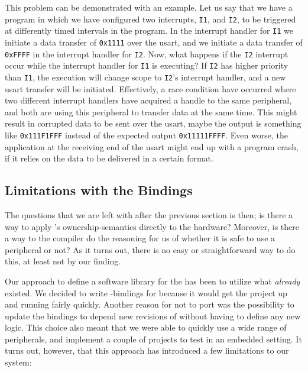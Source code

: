 This problem can be demonstrated with an example.
Let us say that we have a program in which we have configured two interrupts, \texttt{I1}, and \texttt{I2}, to be triggered at differently timed intervals in the program.
In the interrupt handler for \texttt{I1} we initiate a data transfer of \texttt{0x1111} over the \gls{usart}, and we initiate a data transfer of \texttt{0xFFFF} in the interrupt handler for \texttt{I2}.
Now, what happens if the \texttt{I2} interrupt occur while the interrupt handler for \texttt{I1} is executing?
If \texttt{I2} has higher priority than \texttt{I1}, the execution will change scope to \texttt{I2}'s interrupt handler, and a new \gls{usart} transfer will be initiated.
Effectively, a race condition have occurred where two different interrupt handlers have acquired a handle to the same peripheral, and both are using this peripheral to transfer data at the same time.
This might result in corrupted data to be sent over the \gls{usart}, maybe the output is something like \texttt{0x111F1FFF} instead of the expected output \texttt{0x11111FFFF}.
Even worse, the application at the receiving end of the \gls{usart} might end up with a program crash, if it relies on the data to be delivered in a certain format.

\subsection{Limitations with the Bindings}

The questions that we are left with after the previous section is then; is there a way to apply {\rust}'s ownership-semantics directly to the hardware?
Moreover, is there a way to the {\rust} compiler do the reasoning for us of whether it is safe to use a peripheral or not?
As it turns out, there is no easy or straightforward way to do this, at least not by our finding.

Our approach to define a software library for the {\gecko} has been to utilize what \emph{already} existed.
We decided to write {\rust}-bindings for {\emlib} because it would get the project up and running fairly quickly.
Another reason for not to port {\emlib} was the possibility to update the bindings to depend new revisions of {\emlib} without having to define any new logic.
This choice also meant that we were able to quickly use a wide range of peripherals, and implement a couple of projects to test {\rust} in an embedded setting.
It turns out, however, that this approach has introduced a few limitations to our system:


